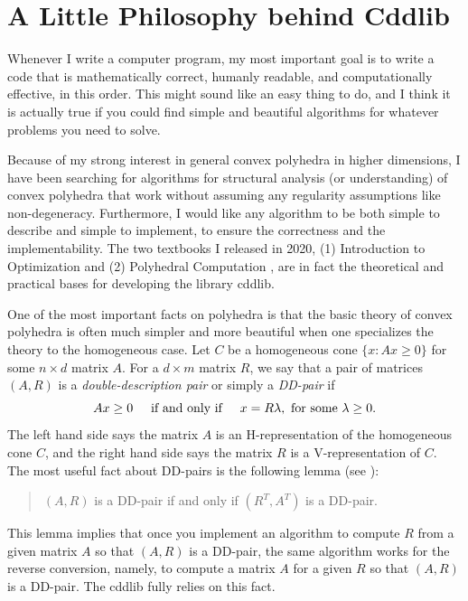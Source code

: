 \documentclass[11pt]{article}
\newcommand {\0} {{\bf 0}}
\begin{document}
\section{A Little Philosophy behind Cddlib}  \label{PHILOSOPHY}

Whenever I write a computer program, my most important goal is
to write a code that is mathematically correct, humanly readable, and
computationally effective,
in this order.  This might sound like an easy thing to do, and I think it is actually true if you could
find simple and beautiful algorithms for whatever problems you need to solve.

Because of my strong interest in general convex polyhedra
in higher dimensions, I have been searching for algorithms for 
structural analysis (or understanding) of convex polyhedra that
work without assuming any regularity assumptions like non-degeneracy.  
Furthermore, I would like any algorithm to be both simple to describe 
and simple to implement, to ensure the correctness and the implementability.
The two textbooks I released in 2020,
(1) Introduction to Optimization \cite{f-io-20} and 
(2) Polyhedral Computation \cite{f-pc-20}, are in fact the theoretical and practical bases
for developing the library cddlib.

One of the most important facts on polyhedra is that the basic theory of
convex polyhedra is often much simpler and more beautiful when one specializes 
the theory to the homogeneous case.    
Let $C$ be a homogeneous cone 
$\{x : A x \ge 0\}$ for some $n\times d$ matrix $A$.  For a $d\times m$ matrix $R$, 
we say that a pair of matrices $(A, R)$  is a {\em double-description pair\/} or 
simply a {\em DD-pair\/} if
\[
  A x \ge 0 \hspace{5mm} \mbox{if and only if} \hspace{5mm} x = R \lambda,  
  \mbox{ for some }\lambda \ge 0 .
  \]
 The left hand side says the matrix $A$ is an H-representation of the homogeneous cone $C$,
 and the right hand side says the matrix $R$ is a V-representation of $C$.  The most useful fact
 about DD-pairs is the following lemma (see \cite[Section 2.5]{f-pc-20}):
 \begin{quote}
   $(A, R)$ is a DD-pair \hspace{3mm}  if and only if \hspace{3mm}  $(R^T, A^T)$ is a DD-pair.
 \end{quote}
This lemma implies that once you implement an algorithm to
 compute $R$ from a given matrix $A$ so that $(A, R)$ is a DD-pair, 
 the same algorithm works for the reverse conversion, namely, to compute a matrix $A$ for a given $R$
 so that $(A, R)$ is a DD-pair.  The cddlib fully relies on this fact.
 
\end{document}
